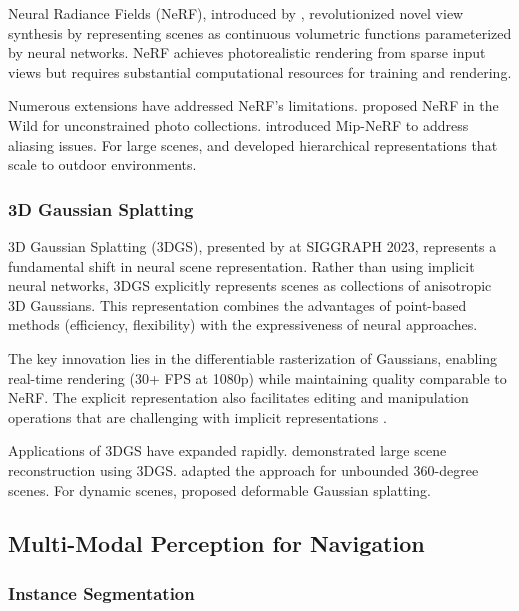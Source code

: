Neural Radiance Fields (NeRF), introduced by \citeauthor{mildenhall2020nerf}, revolutionized novel view synthesis by representing scenes as continuous volumetric functions parameterized by neural networks. NeRF achieves photorealistic rendering from sparse input views but requires substantial computational resources for training and rendering.

Numerous extensions have addressed NeRF's limitations. \citeauthor{martin2021nerf} proposed NeRF in the Wild for unconstrained photo collections. \citeauthor{barron2021mip} introduced Mip-NeRF to address aliasing issues. For large scenes, \citeauthor{zhang2020nerf++} and \citeauthor{xu2022point} developed hierarchical representations that scale to outdoor environments.

\subsubsection{3D Gaussian Splatting}

3D Gaussian Splatting (3DGS), presented by \citeauthor{kerbl20233d} at SIGGRAPH 2023, represents a fundamental shift in neural scene representation. Rather than using implicit neural networks, 3DGS explicitly represents scenes as collections of anisotropic 3D Gaussians. This representation combines the advantages of point-based methods (efficiency, flexibility) with the expressiveness of neural approaches.

The key innovation lies in the differentiable rasterization of Gaussians, enabling real-time rendering (30+ FPS at 1080p) while maintaining quality comparable to NeRF. The explicit representation also facilitates editing and manipulation operations that are challenging with implicit representations \parencite{yang2023deformable}.

Applications of 3DGS have expanded rapidly. \citeauthor{fan2023large} demonstrated large scene reconstruction using 3DGS. \citeauthor{tang2023radial} adapted the approach for unbounded 360-degree scenes. For dynamic scenes, \citeauthor{katsumata2023efficient} proposed deformable Gaussian splatting.

\subsection{Multi-Modal Perception for Navigation}

\subsubsection{Instance Segmentation}

